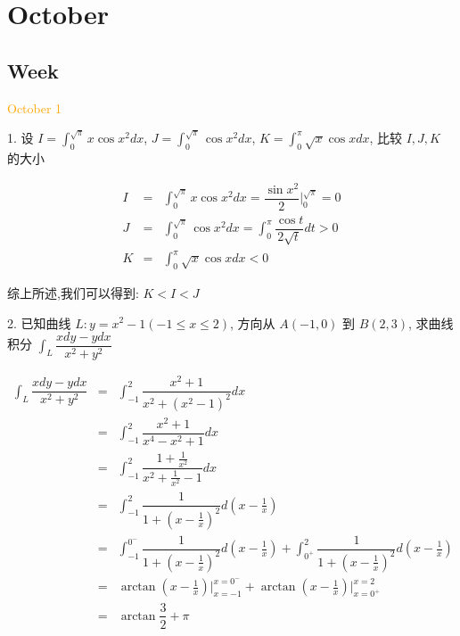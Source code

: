 \chapter{October}
\section{Week }
\textcolor{orange}{October 1}

1. 设 $\displaystyle{I=\int_{0}^{\sqrt{\pi}}x\cos x^2dx}$,
$\displaystyle{J=\int_{0}^{\sqrt{\pi}}\cos x^2dx}$,
$\displaystyle{K=\int_{0}^{\pi}\sqrt{x}\cos xdx}$, 比较 $I,J,K$ 的大小

\begin{solution}

	\begin{eqnarray*}
		I & = & \int_{0}^{\sqrt{\pi}}x\cos x^2dx=\dfrac{\sin x^2}{2}|_{0}^{\sqrt{\pi}}=0 \\
		J & = & \int_{0}^{\sqrt{\pi}}\cos x^2dx=\int_{0}^{\pi}\dfrac{\cos t}{2\sqrt{t}}dt>0 \\
	    K & = & \int_{0}^{\pi}\sqrt{x}\cos xdx<0
	\end{eqnarray*}

	综上所述,我们可以得到: $ K < I < J$
\end{solution}


2. 已知曲线 $L: y=x^2-1(-1\leq x\leq 2)$, 方向从 $A(-1,0)$ 到 $B(2,3)$,
求曲线积分 $\displaystyle{\int_{L}\dfrac{xdy-ydx}{x^2+y^2}}$

\begin{solution}

	\begin{eqnarray*}
		\int_{L}\dfrac{xdy-ydx}{x^2+y^2}
		& = & \int_{-1}^{2}\dfrac{x^2+1}{x^2+(x^2-1)^2}dx\\
		& = & \int_{-1}^{2}\dfrac{x^2+1}{x^4-x^2+1}dx\\
		& = & \int_{-1}^{2}\dfrac{1+\frac{1}{x^2}}{x^2+\frac{1}{x^2}-1}dx\\
		& = & \int_{-1}^{2}\dfrac{1}{1+(x-\frac{1}{x})^2}d(x-\frac{1}{x})\\
		& = & \int_{-1}^{0^{-}}\dfrac{1}{1+(x-\frac{1}{x})^2}d(x-\frac{1}{x})+\int_{0^{+}}^{2}\dfrac{1}{1+(x-\frac{1}{x})^2}d(x-\frac{1}{x})\\
		& = & \arctan(x-\frac{1}{x})\big|_{x=-1}^{x=0^{-}}+\arctan(x-\frac{1}{x})\big|_{x=0^{+}}^{x=2}\\
		& = & \arctan\dfrac{3}{2}+\pi
	\end{eqnarray*}
\end{solution}



